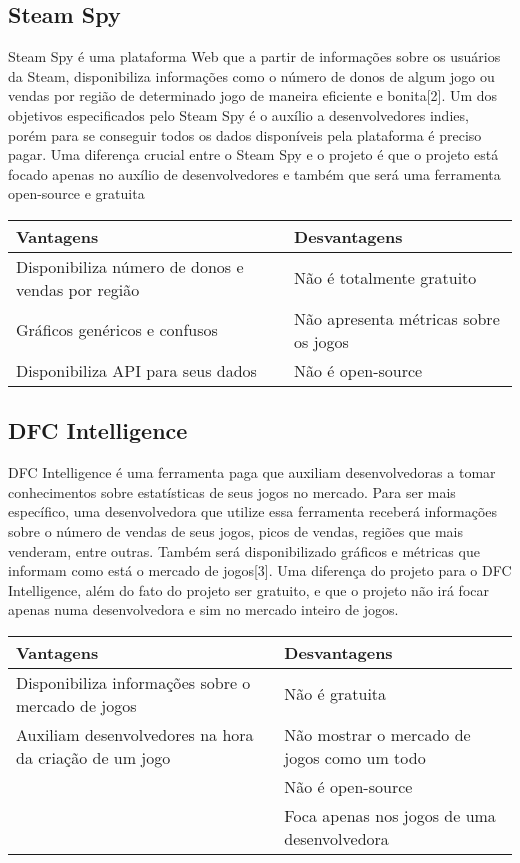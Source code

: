 \subsection*{Steam Spy}
Steam Spy é uma plataforma Web que a partir de informações sobre os usuários da Steam, disponibiliza informações como o número de donos de algum jogo ou vendas por região de determinado jogo de maneira eficiente e bonita[2]. Um dos objetivos especificados pelo Steam Spy é o auxílio a desenvolvedores indies, porém para se conseguir todos os dados disponíveis pela plataforma é preciso pagar. Uma diferença crucial entre o Steam Spy e o projeto é que o projeto está focado apenas no auxílio de desenvolvedores e também que será uma ferramenta open-source e gratuita
\begin{center}
\begin{tabular}{|p{7cm}|p{7cm}|}
\hline \textbf{Vantagens} & \textbf{Desvantagens}
\\
\hline Disponibiliza número de donos e vendas por região & Não é totalmente gratuito
\\
\hline Gráficos genéricos e confusos & Não apresenta métricas sobre os jogos
\\
\hline Disponibiliza API para seus dados & Não é open-source
\\
\hline
\end{tabular}
\end{center}
\subsection*{DFC Intelligence}
DFC Intelligence é uma ferramenta paga que auxiliam desenvolvedoras a tomar conhecimentos sobre estatísticas de seus jogos no mercado. Para ser mais específico, uma desenvolvedora que utilize essa ferramenta receberá informações sobre o número de vendas de seus jogos, picos de vendas, regiões que mais venderam, entre outras. Também será disponibilizado gráficos e métricas que informam como está o mercado de jogos[3]. Uma diferença do projeto para o DFC Intelligence, além do fato do projeto ser gratuito, e que o projeto não irá focar apenas numa desenvolvedora e sim no mercado inteiro de jogos.
\begin{center}
\begin{tabular}{|p{7cm}|p{7cm}|}
\hline \textbf{Vantagens} & \textbf{Desvantagens}
\\
\hline Disponibiliza informações sobre o mercado de jogos & Não é gratuita
\\
\hline Auxiliam desenvolvedores na hora da criação de um jogo & Não mostrar o mercado de jogos como um todo
\\
\hline & Não é open-source
\\
\hline & Foca apenas nos jogos de uma desenvolvedora
\\
\hline
\end{tabular}
\end{center}